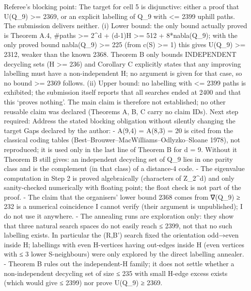 Referee's blocking point: The target for cell 5 is disjunctive: either a
proof that U(Q\_9) \textgreater= 2369, or an explicit labelling of Q\_9
with \textless= 2399 uphill paths. The submission delivers neither. (i)
Lower bound: the only bound actually proved is Theorem A.4, \#paths
\textgreater= 2\^{}d + (d-1)\textbar H\textbar{} \textgreater= 512 +
8*nabla(Q\_9); with the only proved bound nabla(Q\_9) \textgreater= 225
(from c(S) \textgreater= 1) this gives U(Q\_9) \textgreater= 2312,
weaker than the known 2368. Theorem B only bounds INDEPENDENT decycling
sets (\textbar H\textbar{} \textgreater= 236) and Corollary C explicitly
states that any improving labelling must have a non-independent H; no
argument is given for that case, so no bound \textgreater= 2369 follows.
(ii) Upper bound: no labelling with \textless= 2399 paths is exhibited;
the submission itself reports that all searches ended at 2400 and that
this `proves nothing'. The main claim is therefore not established; no
other reusable claim was declared (Theorems A, B, C carry no claim IDs).
Next step required: Address the stated blocking obligation without
silently changing the target Gaps declared by the author: - A(9,4) =
A(8,3) = 20 is cited from the classical coding tables
(Best--Brouwer--MacWilliams--Odlyzko--Sloane 1978), not reproduced; it
is used only in the last line of Theorem B for d = 9. Without it Theorem
B still gives: an independent decycling set of Q\_9 lies in one parity
class and is the complement (in that class) of a distance-4 code. - The
eigenvalue computation in Step 2 is proved algebraically (characters of
Z\_2\^{}d) and only sanity-checked numerically with floating point; the
float check is not part of the proof. - The claim that the organisers'
lower bound 2368 comes from ∇(Q\_9) ≥ 232 is a numerical coincidence I
cannot verify (their argument is unpublished); I do not use it anywhere.
- The annealing runs are exploration only: they show that three natural
search spaces do not easily reach ≤ 2399, not that no such labelling
exists. In particular the (R,B') search fixed the orientation odd→even
inside H; labellings with even H-vertices having out-edges inside H
(even vertices with ≤ 3 lower S-neighbours) were only explored by the
direct labelling annealer. - Theorem B rules out the independent-H
family; it does not settle whether a non-independent decycling set of
size ≤ 235 with small H-edge excess exists (which would give ≤ 2399) nor
prove U(Q\_9) ≥ 2369.

